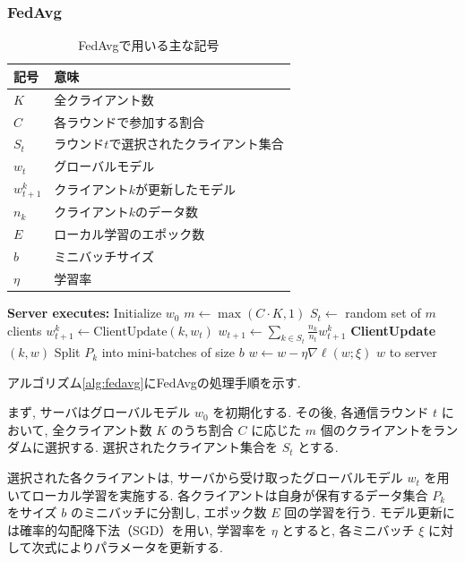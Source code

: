 \documentclass[a4j, twocolumn, dvipdfmx]{jsarticle}
\begin{document}
\subsubsection{FedAvg}
\begin{table}[t]
\centering
\caption{FedAvgで用いる主な記号}
\begin{tabular}{ll}
\hline
記号 & 意味 \\
\hline
$K$ & 全クライアント数 \\
$C$ & 各ラウンドで参加する割合 \\
$S_t$ & ラウンド$t$で選択されたクライアント集合 \\
$w_t$ & グローバルモデル \\
$w_{t+1}^k$ & クライアント$k$が更新したモデル \\
$n_k$ & クライアント$k$のデータ数 \\
$E$ & ローカル学習のエポック数 \\
$b$ & ミニバッチサイズ \\
$\eta$ & 学習率 \\
\hline
\end{tabular}
\label{tab:fedavg_symbol}
\end{table}
\begin{algorithm}[t]
\caption{Federated Averaging (FedAvg)}
\label{alg:fedavg}
\begin{algorithmic}[1]
\State \textbf{Server executes:}
\State Initialize $w_0$
    \State $m \leftarrow \max(C \cdot K, 1)$
    \State $S_t \leftarrow$ random set of $m$ clients
        \State $w_{t+1}^{k} \leftarrow \mathrm{ClientUpdate}(k,w_t)$
    \EndFor
    \State $
    w_{t+1}
    \leftarrow
    \sum_{k \in S_t}
    \frac{n_k}{n_t}
    w_{t+1}^{k}
    $
\EndFor
\Statex
\State \textbf{ClientUpdate}$(k,w)$
\State Split $P_k$ into mini-batches of size $b$
        \State $
        w \leftarrow
        w-\eta\nabla\ell(w;\xi)
        $
    \EndFor
\EndFor
\State \Return $w$ to server
\end{algorithmic}
\end{algorithm}
アルゴリズム\ref{alg:fedavg}にFedAvgの処理手順を示す.

まず, サーバはグローバルモデル $w_0$ を初期化する.
その後, 各通信ラウンド $t$ において, 全クライアント数 $K$ のうち割合 $C$ に応じた $m$ 個のクライアントをランダムに選択する.
選択されたクライアント集合を $S_t$ とする.

選択された各クライアントは, サーバから受け取ったグローバルモデル $w_t$ を用いてローカル学習を実施する.
各クライアントは自身が保有するデータ集合 $P_k$ をサイズ $b$ のミニバッチに分割し, エポック数 $E$ 回の学習を行う.
モデル更新には確率的勾配降下法（SGD）を用い, 学習率を $\eta$ とすると, 各ミニバッチ $\xi$ に対して次式によりパラメータを更新する.
\end{document}
